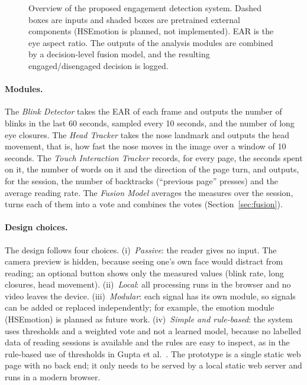 \documentclass[sigconf,nonacm]{acmart}
\begin{document}
\begin{figure}[t]
{%
  }
  \caption{Overview of the proposed engagement detection system. Dashed boxes
  are inputs and shaded boxes are pretrained external components (HSEmotion is planned, not implemented).
  EAR is the eye aspect ratio. The outputs of the analysis modules are combined by a
  decision-level fusion model, and the resulting engaged/disengaged decision is
  logged.}
  \label{fig:overview}
\end{figure}

\paragraph{Modules.}
The \emph{Blink Detector} takes the EAR of each frame and outputs the number of blinks in the last 60 seconds,
sampled every 10 seconds, and the number of long eye closures.
The \emph{Head Tracker} takes the nose landmark and outputs the head movement, that is, how fast the nose moves in the
image over a window of 10 seconds.
The \emph{Touch Interaction Tracker} records, for every page, the seconds spent on it, the number of words on it and the
direction of the page turn, and outputs, for the session, the number of backtracks (``previous page'' presses) and the
average reading rate.
The \emph{Fusion Model} averages the measures over the session, turns each of them into a vote and combines the votes
(Section~\ref{sec:fusion}).

\paragraph{Design choices.}
The design follows four choices.
(i)~\emph{Passive}: the reader gives no input. The camera preview is hidden, because seeing one's own face would distract
from reading; an optional button shows only the measured values (blink rate, long closures, head movement).
(ii)~\emph{Local}: all processing runs in the browser and no video leaves the device.
(iii)~\emph{Modular}: each signal has its own module, so signals can be added or replaced independently; for example,
the emotion module (HSEmotion) is planned as future work.
(iv)~\emph{Simple and rule-based}: the system uses thresholds and a weighted vote and not a learned model, because no
labelled data of reading sessions is available and the rules are easy to inspect, as in the rule-based use of
thresholds in Gupta et al.~\cite{gupta2023multimodal}.
The prototype is a single static web page with no back end; it only needs to be served by a local static web server and runs in a modern browser.
\end{document}

